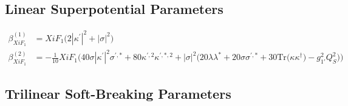 \subsection{Linear Superpotential Parameters}
{\allowdisplaybreaks  \begin{align} 
\beta_{XiF_1}^{(1)} & =  
XiF_1 \Big(2 |\kappa^\prime|^2  + |\sigma|^2\Big)\\ 
\beta_{XiF_1}^{(2)} & =  
-\frac{1}{10} XiF_1 \Big(40 \sigma |\kappa^\prime|^2 \sigma^{\prime,*}  + 80 \kappa^{\prime,2} \kappa^{\prime,*,2}  + |\sigma|^2 \Big(20 \lambda \lambda^*  + 20 \sigma \sigma^{\prime,*}  + 30 \mbox{Tr}\Big({\kappa  \kappa^{\dagger}}\Big)  - g_{1'}^{2} Q_{S}^{2} \Big)\Big)
\end{align}} 
\subsection{Trilinear Soft-Breaking Parameters}

